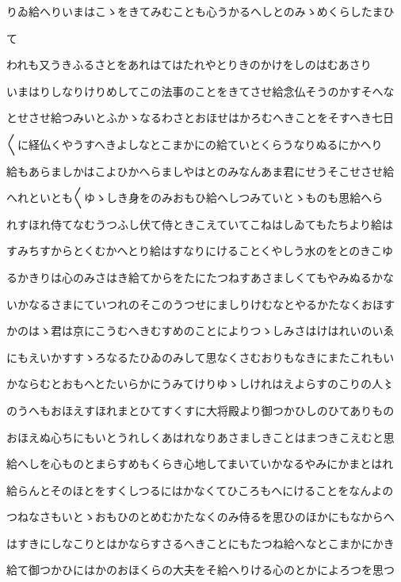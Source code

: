\documentclass[a4paper,11pt,landscape]{ltjtarticle}
\begin{document}
\par\medskip
りゐ給へりいまはこゝをきてみむことも心うかるへしとのみゝめくらしたまひ
\par\medskip
て
\par\medskip
われも又うきふるさとをあれはてはたれやとりきのかけをしのはむあさり
\par\medskip
いまはりしなりけりめしてこの法事のことをきてさせ給念仏そうのかすそへな
\par\medskip
とせさせ給つみいとふかゝなるわさとおほせはかろむへきことをそすへき七日
\par\medskip
〱に経仏くやうすへきよしなとこまかにの給ていとくらうなりぬるにかへり
\par\medskip
給もあらましかはこよひかへらましやはとのみなんあま君にせうそこせさせ給
\par\medskip
へれといとも〱ゆゝしき身をのみおもひ給へしつみていとゝものも思給へら
\par\medskip
れすほれ侍てなむうつふし伏て侍ときこえていてこねはしゐてもたちより給は
\par\medskip
すみちすからとくむかへとり給はすなりにけることくやしう水のをとのきこゆ
\par\medskip
るかきりは心のみさはき給てからをたにたつねすあさましくてもやみぬるかな
\par\medskip
いかなるさまにていつれのそこのうつせにましりけむなとやるかたなくおほす
\par\medskip
かのはゝ君は京にこうむへきむすめのことによりつゝしみさはけはれいのいゑ
\par\medskip
にもえいかすすゝろなるたひゐのみして思なくさむおりもなきにまたこれもい
\par\medskip
かならむとおもへとたいらかにうみてけりゆゝしけれはえよらすのこりの人〻
\par\medskip
のうへもおほえすほれまとひてすくすに大将殿より御つかひしのひてありもの
\par\medskip
おほえぬ心ちにもいとうれしくあはれなりあさましきことはまつきこえむと思
\par\medskip
給へしを心ものとまらすめもくらき心地してまいていかなるやみにかまとはれ
\par\medskip
給らんとそのほとをすくしつるにはかなくてひころもへにけることをなんよの
\par\medskip
つねなさもいとゝおもひのとめむかたなくのみ侍るを思ひのほかにもなからへ
\par\medskip
はすきにしなこりとはかならすさるへきことにもたつね給へなとこまかにかき
\par\medskip
給て御つかひにはかのおほくらの大夫をそ給へりける心のとかによろつを思つ
\end{document}
